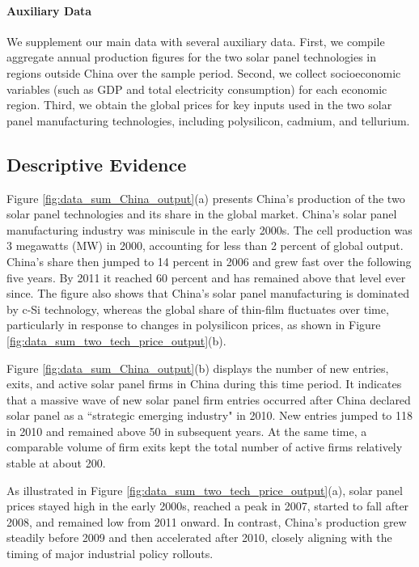 \documentclass[12pt, letter]{article}
\begin{document}
\paragraph{Auxiliary Data}
We supplement our main data with several auxiliary data. First, we compile aggregate annual production figures for the two solar panel technologies in regions outside China over the sample period. Second, we collect socioeconomic variables (such as GDP and total electricity consumption) for each economic region. Third, we obtain the global prices for key inputs used in the two solar panel manufacturing technologies, including polysilicon, cadmium, and tellurium.


\subsection{Descriptive Evidence}
\label{subsec:inst_china_PV}

Figure \ref{fig:data_sum_China_output}(a) presents China's production of the two solar panel technologies and its share in the global market.
China's solar panel manufacturing industry was miniscule in the early 2000s. 
The cell production was 3 megawatts (MW) in 2000, accounting for less than 2 percent of global output. China’s share then jumped to 14 percent in 2006 and grew fast over the following five years. By 2011 it reached 60 percent and has remained above that level ever since. The figure also shows that China’s solar panel manufacturing is dominated by c-Si technology, whereas the global share of thin-film fluctuates over time, particularly in response to changes in polysilicon prices, as shown in Figure \ref{fig:data_sum_two_tech_price_output}(b).

Figure \ref{fig:data_sum_China_output}(b) displays the number of new entries, exits, and active solar panel firms in China during this time period. It indicates that a massive wave of new solar panel firm entries occurred after China declared solar panel as a ``strategic emerging industry" in 2010. New entries jumped to 118 in 2010 and remained above 50 in subsequent years. At the same time, a comparable volume of firm exits kept the total number of active firms relatively stable at about 200. 

As illustrated in Figure \ref{fig:data_sum_two_tech_price_output}(a), solar panel prices stayed high in the early 2000s, reached a peak in 2007, started to fall after 2008, and remained low from 2011 onward. In contrast, China's production grew steadily before 2009 and then accelerated after 2010, closely aligning with the timing of major industrial policy rollouts.
\end{document}
